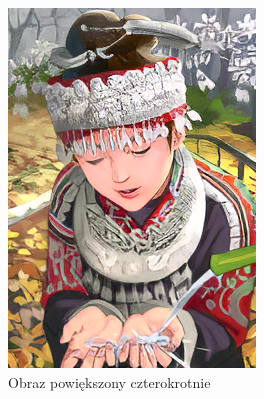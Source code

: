 \begin{figure}[ht]
\begin{minipage}[t]{0.3\linewidth}
        \includegraphics[width=\linewidth]{Rozdziały/02.Podstawy_teoretyczne/comic_ESRGAN_x4.png}
        \caption{Obraz powiększony czterokrotnie}
        \label{fig:image2}
    \end{minipage}
    \hspace{0.5cm}
    \begin{minipage}[t]{0.3\linewidth}

\end{minipage}
\end{figure}
